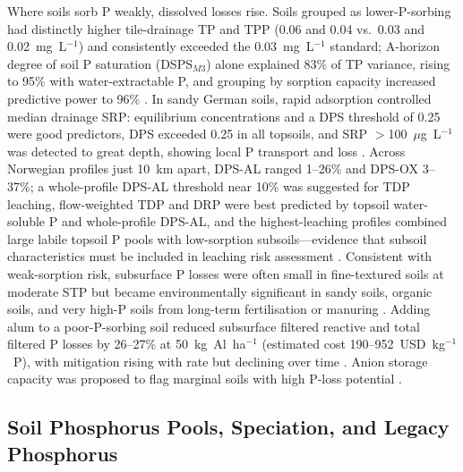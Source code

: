 \documentclass[11pt]{article}
\begin{document}
Where soils sorb P weakly, dissolved losses rise. Soils grouped as lower-P-sorbing had
distinctly higher tile-drainage TP and TPP (0.06 and 0.04 vs.\ 0.03 and 0.02~mg~L$^{-1}$)
and consistently exceeded the 0.03~mg~L$^{-1}$ standard; A-horizon degree of soil P
saturation (DSPS$_{M3}$) alone explained 83\% of TP variance, rising to 95\% with
water-extractable P, and grouping by sorption capacity increased predictive power to
96\% \parencite{Beauchemin2003}. In sandy German soils, rapid adsorption controlled
median drainage SRP: equilibrium concentrations and a DPS threshold of 0.25 were good
predictors, DPS exceeded 0.25 in all topsoils, and SRP $>$100~$\mu$g~L$^{-1}$ was
detected to great depth, showing local P transport and loss \parencite{Siemens2004}.
Across Norwegian profiles just 10~km apart, DPS-AL ranged 1--26\% and DPS-OX 3--37\%; a
whole-profile DPS-AL threshold near 10\% was suggested for TDP leaching, flow-weighted
TDP and DRP were best predicted by topsoil water-soluble P and whole-profile DPS-AL,
and the highest-leaching profiles combined large labile topsoil P pools with
low-sorption subsoils---evidence that subsoil characteristics must be included in
leaching risk assessment \parencite{Liu2024b}. Consistent with weak-sorption risk,
subsurface P losses were often small in fine-textured soils at moderate STP but became
environmentally significant in sandy soils, organic soils, and very high-P soils from
long-term fertilisation or manuring \parencite{Sims1998}. Adding alum to a
poor-P-sorbing soil reduced subsurface filtered reactive and total filtered P losses by
26--27\% at 50~kg~Al~ha$^{-1}$ (estimated cost 190--952~USD~kg$^{-1}$~P), with
mitigation rising with rate but declining over time \parencite{McDowell2015}. Anion
storage capacity was proposed to flag marginal soils with high P-loss potential
\parencite{McDowell2015b}.

\subsection{Soil Phosphorus Pools, Speciation, and Legacy Phosphorus}
\end{document}
